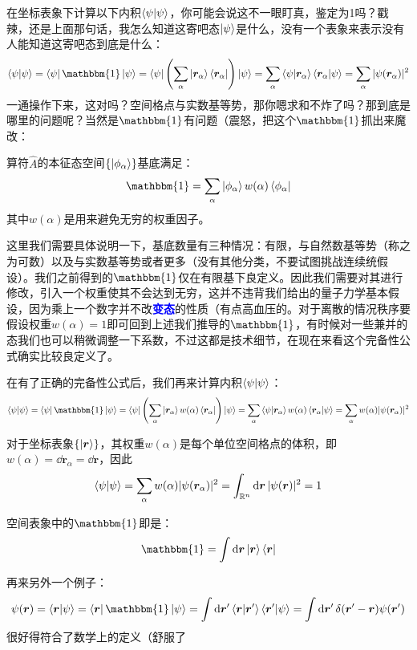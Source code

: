 在坐标表象下计算以下内积$\bra{\psi}\ket{\psi}$，你可能会说这不一眼盯真，鉴定为1吗？戳辣，还是上面那句话，我怎么知道这寄吧态$\ket{\psi}$是什么，没有一个表象来表示没有人能知道这寄吧态到底是什么：
\[\bra{\psi}\ket{\psi}=\bra{\psi}\mathbbm{1}\ket{\psi}=\bra{\psi}\left(\sum_{\alpha}\ket{\bm{r}_{\alpha}}\bra{\bm{r}_{\alpha}}\right)\ket{\psi}=\sum_{\alpha}\bra{\psi}\ket{\bm{r}_{\alpha}}\bra{\bm{r}_{\alpha}}\ket{\psi}=\sum_{\alpha}|\psi(\bm{r}_{\alpha})|^2\]
一通操作下来，这对吗？空间格点与实数基等势，那你嗯求和不炸了吗？那到底是哪里的问题呢？当然是$\mathbbm{1}$有问题（震怒，把这个$\mathbbm{1}$抓出来魔改：
\begin{theorem}[完备性公式]
算符$\hat{A}$的本征态空间$\{\ket{\phi_{\alpha}}\}$基底满足：
\[\mathbbm{1}=\sum_{\alpha}\ket{\phi_{\alpha}}w(\alpha)\bra{\phi_{\alpha}}\]
其中$w(\alpha)$是用来避免无穷的权重因子。
\end{theorem}

这里我们需要具体说明一下，基底数量有三种情况：有限，与自然数基等势（称之为可数）以及与实数基等势或者更多（没有其他分类，不要试图挑战连续统假设）。我们之前得到的$\mathbbm{1}$仅在有限基下良定义。因此我们需要对其进行修改，引入一个权重使其不会达到无穷，这并不违背我们给出的量子力学基本假设，因为乘上一个数字并不改\textcolor{blue}{\textbf{变态}}的性质（有点高血压的。对于离散的情况秩序要假设权重$w(\alpha)=1$即可回到上述我们推导的$\mathbbm{1}$，有时候对一些兼并的态我们也可以稍微调整一下系数，不过这都是技术细节，在现在来看这个完备性公式确实比较良定义了。

在有了正确的完备性公式后，我们再来计算内积$\bra{\psi}\ket{\psi}$：
\[\bra{\psi}\ket{\psi}=\bra{\psi}\mathbbm{1}\ket{\psi}=\bra{\psi}\left(\sum_{\alpha}\ket{\bm{r}_{\alpha}}w(\alpha)\bra{\bm{r}_{\alpha}}\right)\ket{\psi}=\sum_{\alpha}\bra{\psi}\ket{\bm{r}_{\alpha}}w(\alpha)\bra{\bm{r}_{\alpha}}\ket{\psi}=\sum_{\alpha}w(\alpha)|\psi(\bm{r}_{\alpha})|^2\]

对于坐标表象$\{\ket{\bm{r}}\}$，其权重$w(\alpha)$是每个单位空间格点的体积，即$w(\alpha)=\dd{\bm{r}_{\alpha}}=\dd{\bm{r}}$，因此
\[\bra{\psi}\ket{\psi}=\sum_{\alpha}w(\alpha)|\psi(\bm{r}_{\alpha})|^2=\int_{\mathbb{R}^n}\dd{\bm{r}}|\psi(\bm{r})|^2=1\]

空间表象中的$\mathbbm{1}$即是：
\[\mathbbm{1}=\int\dd{\bm{r}}\ket{\bm{r}}\bra{\bm{r}}\]

再来另外一个例子：
\[\psi(\bm{r})=\bra{\bm{r}}\ket{\psi}=\bra{\bm{r}}\mathbbm{1}\ket{\psi}=\int\dd{\bm{r}'}\bra{\bm{r}}\ket{\bm{r}'}\bra{\bm{r}'}\ket{\psi}=\int\dd{\bm{r}'}\delta(\bm{r}'-\bm{r})\psi(\bm{r}')\]
很好得符合了数学上的定义（舒服了

